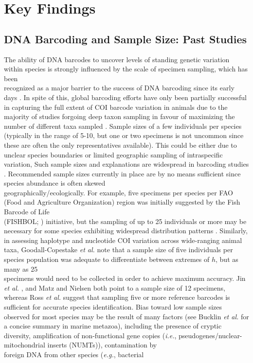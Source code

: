 \section{Key Findings}

\subsection{DNA Barcoding and Sample Size: Past Studies}

The ability of DNA barcodes to uncover levels of standing genetic variation within species is strongly influenced by the scale of specimen sampling, which has been \\ recognized as a major barrier to the success of DNA barcoding since its early days  \cite{hebert2004identification, meyer2005dna, ward2005dna}. In spite of this, global barcoding efforts have only been partially successful in capturing the full extent of COI barcode variation in animals due to the majority of studies forgoing deep taxon sampling in favour of maximizing the number of different taxa sampled \cite{matz2005likelihood, zhang2010estimating}. Sample sizes of a few individuals per species (typically in the range of 5-10, but one or two specimens is not uncommon since these are often the only representatives available). This could be either due to unclear species boundaries  or limited geographic sampling of intraspecific variation, Such sample sizes and explanations are widespread in barcoding studies \cite{hajibabaei2007dna, matz2005likelihood, zhang2010estimating}. Recommended sample sizes currently in place are by no means sufficient since species abundance is often skewed \\ geographically/ecologically. For example, five specimens per species per FAO (Food and Agriculture Organization) region was initially suggested by the Fish Barcode of Life \\ (FISHBOL; \cite{ward2009campaign}) initiative, but the sampling of up to 25 individuals or more may be necessary for some species exhibiting widespread distribution patterns \cite{becker2011five, steinke2011fish}. Similarly, in assessing haplotype and nucleotide COI variation across wide-ranging animal taxa, Goodall-Copestake \textit{et al.} \cite{goodall2012comparison} note that a sample size of five individuals per species population was adequate to differentiate between extremes of $h$, but as many as 25 \\ specimens would need to be collected in order to achieve maximum accuracy. Jin \textit{et al.} \cite{jin2012simple}, and Matz and Nielsen \cite{matz2005likelihood} both point to a sample size of 12 specimens, whereas Ross \textit{et al.} \cite{ross2008testing} suggest that sampling five or more reference barcodes is sufficient for accurate species identification. Bias toward low sample sizes observed for most species may be the result of many factors (see Bucklin \textit{et al.} \cite{bucklin2011dna} for a concise summary in marine metazoa), including the presence of cryptic diversity, amplification of non-functional gene copies (\textit{i.e.}, pseudogenes/nuclear-mitochondrial inserts (NUMTs)), contamination by \\ foreign DNA from other species (\textit{e.g.}, bacterial 